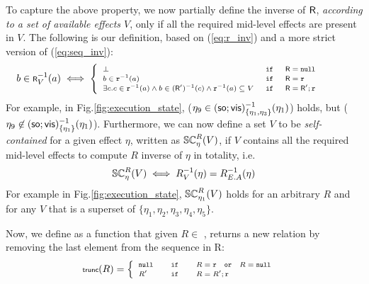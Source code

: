 To capture the above property, we now partially define the 
inverse of ${\normalfont \textsf{R}}$, \emph{according to a set of available effects $V$}, 
only if all the required mid-level effects are present in $V$.
The following is our definition, based on (\ref{eq:r_inv}) and a more
strict version of (\ref{eq:seq_inv}):
\begin{equation}
\label{eq:R_inv}
\scriptsize
b \in {\normalfont \textsf{R}}^{-1}_V(a) \iff
\begin{cases}
\begin{array} {lllll} 
\bot & \;\mathtt {if}\; & {\normalfont \textsf{R}} = \mathtt{null}& & \\
b \in \mathtt{r}^{-1}(a) & \;\mathtt {if}\; & {\normalfont \textsf{R}}=\mathtt{r} & & \\
\exists c. c \in
\mathtt{r}^{-1}(a) \wedge b \in ({\normalfont \textsf{R}}')^{-1}(c) \wedge
\mathtt{r}^{-1}(a) \subseteq V   & \;\mathtt {if}\; & {\normalfont \textsf{R}}={\normalfont \textsf{R}}';\mathtt{r} & & \;
\end{array}
\end{cases}
\end{equation}
For example, in Fig.\ref{fig:execution_state}, 
{\footnotesize  ($\eta_9 \in
({\textsf{so}};{\normalfont \textsf{vis}})_{\{\eta_1,\eta_3\}}^{-1}(\eta_1)$)}
holds, but {\footnotesize($\eta_9 \not\in ({\textsf{so}};{\normalfont \textsf{vis}})_{\{\eta_1\}}^{-1}(\eta_1)$)}. 
Furthermore, we can now define a set $V$ to be \emph{self-contained} for
a given effect $\eta$,
written as {\footnotesize $\SC
R \eta V$}, if $V$ contains all the required mid-level effects to compute
$R$ inverse of $\eta$ in totality, i.e.
\begin{equation}
\scriptsize 
\SC R \eta {V} \iff R^{-1}_V(\eta) = R^{-1}_{E.A}(\eta)
\end{equation}
For example in Fig.\ref{fig:execution_state}, {\footnotesize $\SC R
{\eta_1} V$} holds for an arbitrary  $R$ and for any $V$ that is a superset of
{\footnotesize $\{\eta_1,\eta_2,\eta_3,\eta_4,\eta_5\}$}.

Now, we define {\footnotesize \trunc{}} as a function that
given  $R \in$ \relationS{}, 
returns a new relation by removing the last element from the sequence
in R:
\begin{equation}
\scriptsize
\trunc{R} = 
\begin{cases}
\begin{array}{lcl}
\nullR & \quad \myif \quad & R = \rel \quad \mathtt{or} \quad R = \nullR \\
R' & \quad \myif \quad & R = R';\rel 
\end{array}
\end{cases}
\end{equation}

